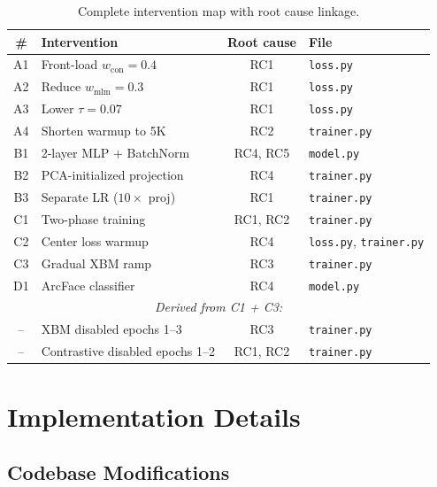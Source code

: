 \documentclass[11pt,a4paper]{article}
\begin{document}
\begin{table}[H]
\centering
\caption{Complete intervention map with root cause linkage.}
\label{tab:interventions}
\small
\begin{tabular}{clcl}
\toprule
\textbf{\#} & \textbf{Intervention} & \textbf{Root cause} & \textbf{File} \\
\midrule
A1 & Front-load $w_{\text{con}} = 0.4$ & RC1 & \texttt{loss.py} \\
A2 & Reduce $w_{\text{mlm}} = 0.3$ & RC1 & \texttt{loss.py} \\
A3 & Lower $\tau = 0.07$ & RC1 & \texttt{loss.py} \\
A4 & Shorten warmup to 5K & RC2 & \texttt{trainer.py} \\
\midrule
B1 & 2-layer MLP + BatchNorm & RC4, RC5 & \texttt{model.py} \\
B2 & PCA-initialized projection & RC4 & \texttt{trainer.py} \\
B3 & Separate LR ($10\times$ proj) & RC1 & \texttt{trainer.py} \\
\midrule
C1 & Two-phase training & RC1, RC2 & \texttt{trainer.py} \\
C2 & Center loss warmup & RC4 & \texttt{loss.py}, \texttt{trainer.py} \\
C3 & Gradual XBM ramp & RC3 & \texttt{trainer.py} \\
\midrule
D1 & ArcFace classifier & RC4 & \texttt{model.py} \\
\midrule
\multicolumn{4}{c}{\textit{Derived from C1 + C3:}} \\
-- & XBM disabled epochs 1--3 & RC3 & \texttt{trainer.py} \\
-- & Contrastive disabled epochs 1--2 & RC1, RC2 & \texttt{trainer.py} \\
\bottomrule
\end{tabular}
\end{table}

\section{Implementation Details}

\subsection{Codebase Modifications}
\end{document}
